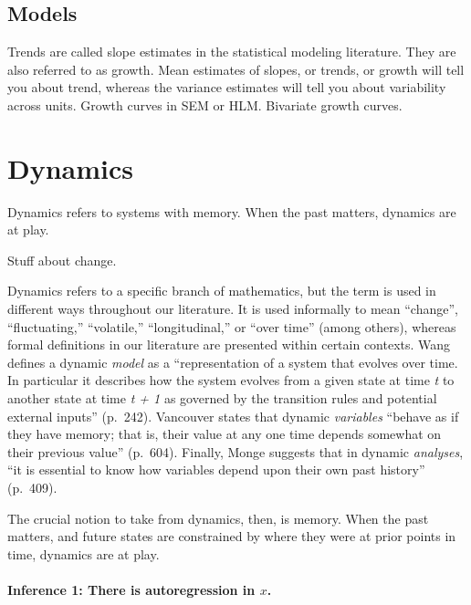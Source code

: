 \documentclass[english,,man]{apa6}
\let\oldparagraph\paragraph
\renewcommand{\paragraph}[1]{\oldparagraph{#1}\mbox{}}
\theoremstyle{definition}
\theoremstyle{definition}
\theoremstyle{definition}
\theoremstyle{remark}
\begin{document}
\hypertarget{models-1}{%
\subsection{Models}\label{models-1}}

Trends are called slope estimates in the statistical modeling
literature. They are also referred to as growth. Mean estimates of
slopes, or trends, or growth will tell you about trend, whereas the
variance estimates will tell you about variability across units. Growth
curves in SEM or HLM. Bivariate growth curves.

\hypertarget{dynamics}{%
\section{Dynamics}\label{dynamics}}

Dynamics refers to systems with memory. When the past matters, dynamics
are at play.

Stuff about change.

Dynamics refers to a specific branch of mathematics, but the term is
used in different ways throughout our literature. It is used informally
to mean \enquote{change}, \enquote{fluctuating,} \enquote{volatile,}
\enquote{longitudinal,} or \enquote{over time} (among others), whereas
formal definitions in our literature are presented within certain
contexts. Wang defines a dynamic \emph{model} as a
\enquote{representation of a system that evolves over time. In
particular it describes how the system evolves from a given state at
time \emph{t} to another state at time \emph{t + 1} as governed by the
transition rules and potential external inputs} (p.~242). Vancouver
states that dynamic \emph{variables} \enquote{behave as if they have
memory; that is, their value at any one time depends somewhat on their
previous value} (p.~604). Finally, Monge suggests that in dynamic
\emph{analyses}, \enquote{it is essential to know how variables depend
upon their own past history} (p.~409).

The crucial notion to take from dynamics, then, is memory. When the past
matters, and future states are constrained by where they were at prior
points in time, dynamics are at play.

\hypertarget{inference-1-there-is-autoregression-in-x.}{%
\paragraph{\texorpdfstring{Inference 1: There is autoregression in
\(x\).}{Inference 1: There is autoregression in x.}}\label{inference-1-there-is-autoregression-in-x.}}
\end{document}
